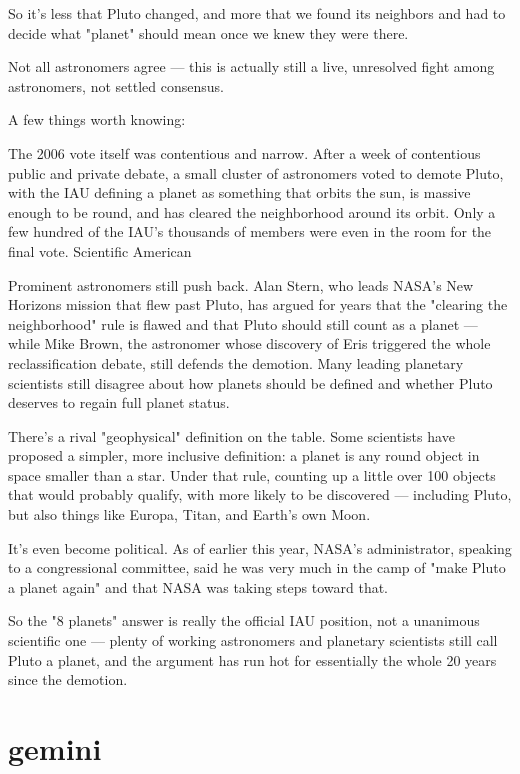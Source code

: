 So it's less that Pluto changed, and more that we found its neighbors and had to decide what "planet" should mean once we knew they were there.

Not all astronomers agree — this is actually still a live, unresolved fight among astronomers, not settled consensus.

A few things worth knowing:

The 2006 vote itself was contentious and narrow. After a week of contentious public and private debate, a small cluster of astronomers voted to demote Pluto, with the IAU defining a planet as something that orbits the sun, is massive enough to be round, and has cleared the neighborhood around its orbit. Only a few hundred of the IAU's thousands of members were even in the room for the final vote. 
Scientific American

Prominent astronomers still push back. Alan Stern, who leads NASA's New Horizons mission that flew past Pluto, has argued for years that the "clearing the neighborhood" rule is flawed and that Pluto should still count as a planet — while Mike Brown, the astronomer whose discovery of Eris triggered the whole reclassification debate, still defends the demotion. Many leading planetary scientists still disagree about how planets should be defined and whether Pluto deserves to regain full planet status. 

There's a rival "geophysical" definition on the table. Some scientists have proposed a simpler, more inclusive definition: a planet is any round object in space smaller than a star. Under that rule, counting up a little over 100 objects that would probably qualify, with more likely to be discovered — including Pluto, but also things like Europa, Titan, and Earth's own Moon. 

It's even become political. As of earlier this year, NASA's administrator, speaking to a congressional committee, said he was very much in the camp of "make Pluto a planet again" and that NASA was taking steps toward that. 

So the "8 planets" answer is really the official IAU position, not a unanimous scientific one — plenty of working astronomers and planetary scientists still call Pluto a planet, and the argument has run hot for essentially the whole 20 years since the demotion.

\section{gemini}

